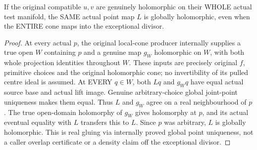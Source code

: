 \begin{theorem}
\label{hir:submersion-blowup-cartesian-global-holomorphic-cone}
\leanok
{}
If the original compatible $u,v$ are genuinely holomorphic on their WHOLE
actual test manifold, the SAME actual point map $L$ is globally holomorphic,
even when the ENTIRE cone maps into the exceptional divisor.
\end{theorem}
\begin{proof}
At every actual $p$, the original local-cone producer internally supplies a
true open $W$ containing $p$ and a genuine map $g_W$ holomorphic on $W$,
with both whole projection identities throughout $W$. These inputs are
precisely original $f$, primitive choices and the original holomorphic
cone; no invertibility of its pulled centre ideal is assumed. At EVERY
$q\in W$, both $Lq$ and $g_Wq$ have equal actual source base and actual
lift image. Genuine arbitrary-choice global joint-point uniqueness makes
them equal. Thus $L$ and $g_W$ agree on a real neighbourhood of $p$.
The true open-domain holomorphy of $g_W$ gives holomorphy at $p$, and its
actual eventual equality with $L$ transfers this to $L$. Since $p$ was
arbitrary, $L$ is globally holomorphic. This is real gluing via internally
proved global point uniqueness, not a caller overlap certificate or a
density claim off the exceptional divisor.
\end{proof}

